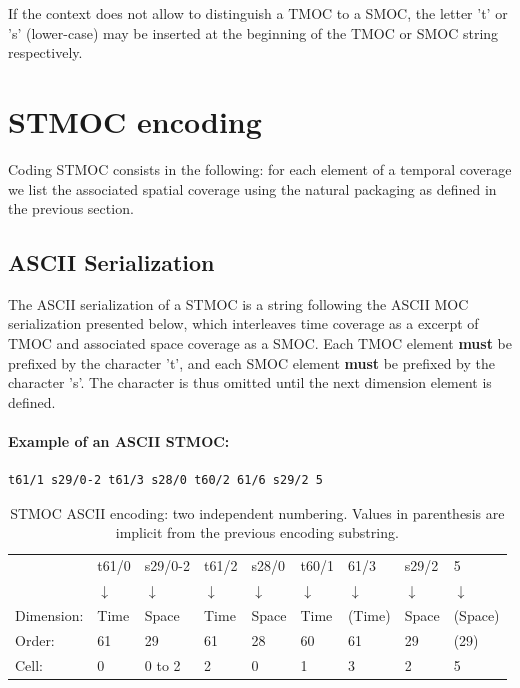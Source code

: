 \documentclass[11pt,a4paper]{ivoa}
\begin{document}
If the context does not allow to distinguish a TMOC to a SMOC,
the letter ’t’ or ’s’ (lower-case) may be inserted at the beginning
of the TMOC or SMOC string respectively.

\section{STMOC encoding}
\label{sec:stmoc}
Coding STMOC consists in the following: for each element of a
temporal coverage we list the associated spatial coverage using the
natural packaging as defined in the previous section. 

\subsection{ASCII Serialization}
The ASCII serialization of a STMOC is a string following the ASCII MOC
serialization presented below, which interleaves time coverage as a
excerpt of TMOC and associated space coverage as a SMOC. Each TMOC
element {\bf must} be prefixed by the character 't', and each SMOC
element {\bf must} be prefixed by the character 's'.
The character is thus omitted until the next dimension element is
defined.

\paragraph{Example of an ASCII STMOC:}
\begin{Verbatim}[frame=single]
  t61/1 s29/0-2 t61/3 s28/0 t60/2 61/6 s29/2 5
\end{Verbatim}

\begin{table}[!htbp]
\begin{center}
   {\small
   \begin{tabular} { l l l l l l l l l }
   & t61/0      & s29/0-2    & t61/2      & s28/0 & t60/1 & 61/3 & s29/2 & 5\\
   & $\downarrow$ & $\downarrow$ & $\downarrow$ & $\downarrow$ & $\downarrow$ & $\downarrow$ & $\downarrow$ & $\downarrow$ \\
Dimension: & Time & Space  & Time  & Space & Time  & (Time) & Space & (Space) \\
Order:     & 61   & 29     & 61    & 28    & 60    & 61     &  29   & (29)\\
Cell:      & 0    & 0 to 2 & 2     & 0     & 1     & 3      &  2    & 5 \\
\end{tabular}
}
\end{center}
\caption*{STMOC ASCII encoding: two independent numbering. Values in parenthesis are implicit from the previous encoding substring.}\label{table:stmoc-ascii-ex}
\end{table}
\end{document}
